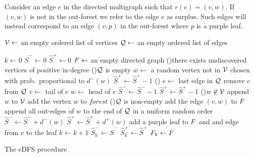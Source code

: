 Consider an edge $e$ in the directed multigraph such that $r(e) = (v, w)$. If $(v, w)$ is not in the out-forest we refer to the edge $e$ as surplus. Such edges will instead correspond to an edge $(v, p)$ in the out-forest where $p$ is a purple leaf.

\begin{algorithm}[htbp]
    \SetAlgoLined
    $\mathcal V \leftarrow$ an empty ordered list of vertices \;
    $\mathcal Q \leftarrow$ an empty ordered list of edges \;

    $k \leftarrow 0$  \;
    $\hat{S}^- \leftarrow 0$ \;
    $\hat{S}^+ \leftarrow 0$  \;
    $F \leftarrow$ an empty directed graph \;
    \While(){there exists undiscovered vertices of positive in-degree}{
        \eIf(){$\mathcal Q$ is empty}{
            $w \leftarrow$ a random vertex not in $\mathcal V$ chosen with prob.\ proportional to $d^-(w)$ \;
            $\hat{S}^+ \leftarrow \hat{S}^+ - 1$  \;
        }(){
            $e \leftarrow$ last edge in $\mathcal Q$ \;
            remove $e$ from $\mathcal Q$ \;
            $v \leftarrow$ tail of $e$\;
            $w \leftarrow$ head of $e$ \;
            $\hat{S}^- \leftarrow \hat{S}^- - 1$  \;
            $\hat{S}^+ \leftarrow \hat{S}^+ - 1$  \;
        }
        \eIf(){$w \not \in \mathcal V$}{
            append $w$ to $\mathcal V$ \; 
            add the vertex $w$ to $forest$ \;
            \If(){$\mathcal Q$ is non-empty}{
                add the edge $(v, w)$ to $F$\;
            }
            append all out-edges of $w$ to the end of $\mathcal Q$ in a uniform random order \;
            $\hat{S}^- \leftarrow \hat{S}^- + d^-(w)$  \;
            $\hat{S}^+ \leftarrow \hat{S}^+ + d^+(w)$ \;
        }{
            add a purple leaf to $F$ and and edge from $v$ to the leaf \;
        }
        $k \leftarrow k + 1$ \;
        $\hat{S}^-_k \leftarrow \hat{S}^-$ \;
        $\hat{S}^+_k \leftarrow \hat{S}^+$ \;
        $F_k \leftarrow F$ \;
    }
    \caption{The eDFS procedure \label{alg:edfs}}
\end{algorithm}

